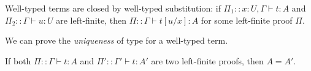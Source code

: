 \begin{proposition}
Well-typed terms are closed by well-typed substitution:
if $\Pi_1:: x:U, \Gamma \vdash t:A$ and $\Pi_2:: \Gamma \vdash u:U$
are left-finite,
then $\Pi::\Gamma \vdash t[u/x]:A$ for some left-finite proof $\Pi$.
\end{proposition}

%
%

We can prove the \emph{uniqueness} of type for a well-typed term. 


\begin{proposition}
\label{proposition-left-finite-unique}
If both $\Pi::\Gamma \vdash t:A$ and $\Pi'::\Gamma' \vdash t:A'$ are two left-finite proofs,
then $A = A'$.
\end{proposition}

